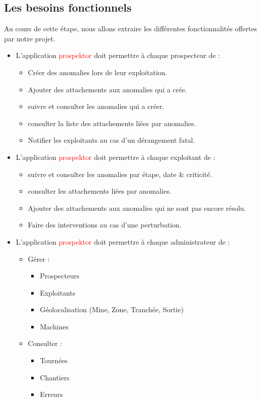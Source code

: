 \subsection{Les besoins fonctionnels}
Au cours de cette \'etape, nous allons extraire les diff\'erentes fonctionnalit\'es offertes par notre projet.
\begin{itemize}
\item L'application \textcolor{red}{prospektor} doit permettre \`a chaque prospecteur de :
\begin{itemize}
\item Cr\'eer des anomalies lors de leur exploitation.
\item Ajouter des attachements aux anomalies qui a cr\'ee.
\item suivre et consulter les anomalies qui a cr\'eer.
\item consulter la liste des attachements li\'ees par anomalies.
\item Notifier les exploitants au cas d'un d\'erangement fatal.
\end{itemize}
\item L'application \textcolor{red}{prospektor} doit permettre \`a chaque exploitant de :
\begin{itemize}
\item suivre et consulter les anomalies par \'etape, date \& criticit\'e.
\item consulter les attachements li\'ees par anomalies.
\item Ajouter des attachements aux anomalies qui ne sont pas encore r\'esolu.
\item Faire des interventions au cas d'une perturbation.
\end{itemize}  
\item L'application \textcolor{red}{prospektor} doit permettre \`a chaque administrateur de :
\begin{itemize}
\item G\'erer :
\begin{itemize}
\item Prospecteurs
\item Exploitants
\item G\'eolocalisation (Mine, Zone, Tranch\'ee, Sortie)
\item Machines
\end{itemize}
\item Consulter :
\begin{itemize}
\item Tourn\'ees
\item Chantiers
\item Erreurs
\end{itemize}

\end{itemize} 
 
\end{itemize}

